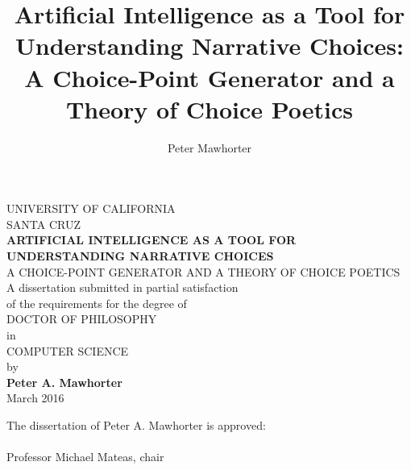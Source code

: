 
\title{Artificial Intelligence as a Tool for Understanding Narrative Choices: A Choice-Point Generator and a Theory of Choice Poetics}
\author{Peter Mawhorter}

\begin{titlepage}
\begin{center}
UNIVERSITY OF CALIFORNIA \\
SANTA CRUZ \vspace{\baselineskip} \\
\textbf{ARTIFICIAL INTELLIGENCE AS A TOOL FOR UNDERSTANDING NARRATIVE CHOICES} \\
A CHOICE-POINT GENERATOR AND A THEORY OF CHOICE POETICS \vspace{\baselineskip} \\
A dissertation submitted in partial satisfaction \\
of the requirements for the degree of \vspace{0.8\baselineskip} \\
DOCTOR OF PHILOSOPHY \vspace{0.8\baselineskip} \\
in \vspace{0.8\baselineskip} \\
COMPUTER SCIENCE \vspace{0.8\baselineskip} \\
by \vspace{0.8\baselineskip} \\
\textbf{Peter A. Mawhorter} \vspace{\baselineskip} \\
March 2016 \vspace{\baselineskip} \\
\end{center}
\raggedleft
\hfill\parbox{25em}{
The dissertation of Peter A. Mawhorter is approved: \vspace{2\baselineskip} \\
\hspace*{5em}\underline{\hspace{20em}} \\
\hspace*{5em}Professor Michael Mateas, chair \vspace{2.25\baselineskip} \\
\hspace*{5em}\underline{\hspace{20em}} \\
}
\end{titlepage}
